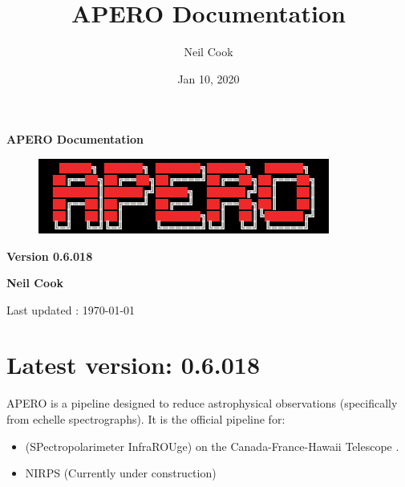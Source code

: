 \documentclass[a4paper,10pt,english]{report}
\title{APERO Documentation}
\date{Jan 10, 2020}
\author{Neil Cook}
\begin{document}
\pagestyle{empty}


        \begin{titlepage}
            \centering

            \vspace*{40mm} %
            \textbf{\Huge {APERO Documentation}}

            \vspace{5mm}
            \begin{figure}[!h]
                \centering
                \includegraphics[scale=1]{apero_logo.png}
            \end{figure}
            
            \vspace{5mm}
            \Large \textbf{Version 0.6.018}
            
            \vspace{5mm}
            \Large \textbf{{Neil Cook}}

            \vspace*{0mm}
            \small  Last updated : \MonthYearFormat\today


        \end{titlepage}

        \clearpage
        \tableofcontents

        
\pagestyle{plain}
 
\pagestyle{normal}
\label{\detokenize{index::doc}}



\chapter{Latest version: 0.6.018}
\label{\detokenize{index:latest-version-0-6-018}}
APERO is a pipeline designed to reduce astrophysical observations (specifically from echelle spectrographs).
It is the official pipeline for:
\begin{itemize}
\item {} 
 (SPectropolarimeter InfraROUge) on the Canada-France-Hawaii Telescope .

\item {} 
NIRPS (Currently under construction)

\end{itemize}
\end{document}
